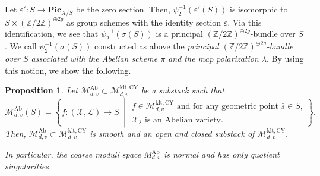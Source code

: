 \documentclass[12pt,twoside]{amsart}
\newtheorem{prop}[thm]{Proposition}
\theoremstyle{definition}
\begin{document}
Let $\varepsilon'\colon S\to \mathbf{Pic}_{X/S}$ be the zero section.
Then, $\psi_2^{-1}(\varepsilon'(S))$ is isomorphic to $S\times (\mathbb{Z}/2\mathbb{Z})^{\oplus 2g}$ as group schemes with the identity section $\varepsilon$.
Via this identification, we see that $\psi_2^{-1}(\sigma(S))$ is a principal $(\mathbb{Z}/2\mathbb{Z})^{\oplus 2g}$-bundle over $S$.
We call $\psi_2^{-1}(\sigma(S))$ constructed as above the {\it principal $(\mathbb{Z}/2\mathbb{Z})^{\oplus 2g}$-bundle over $S$ associated with the Abelian scheme $\pi$ and the map polarization $\lambda$}.     
By using this notion, we show the following.

    

\begin{prop}\label{prop--smoothness--of--Abelian--moduli}
    Let $\mathcal{M}^{\mathrm{Ab}}_{d,v}\subset\mathcal{M}^{\mathrm{klt,CY}}_{d,v}$ be a substack such that 
     \[\mathcal{M}^{\mathrm{Ab}}_{d,v}(S)=
\left\{
 f\colon(\mathcal{X},\mathcal{L})\to S
\;\middle|
\begin{array}{l}
\text{$f\in\mathcal{M}^{\mathrm{klt,CY}}_{d,v}$ and for any geometric point $\bar{s}\in S$,}\\
\text{$\mathcal{X}_{\bar{s}}$ is an Abelian variety.}
\end{array}\right\}.
    \]
    Then, $\mathcal{M}_{d,v}^{\mathrm{Ab}}\subset\mathcal{M}^{\mathrm{klt,CY}}_{d,v}$ is smooth and an open and closed substack of $\mathcal{M}^{\mathrm{klt,CY}}_{d,v}$.

    In particular, the coarse moduli space $M_{d,v}^{\mathrm{Ab}}$ is normal and has only quotient singularities.
\end{prop}
\end{document}
